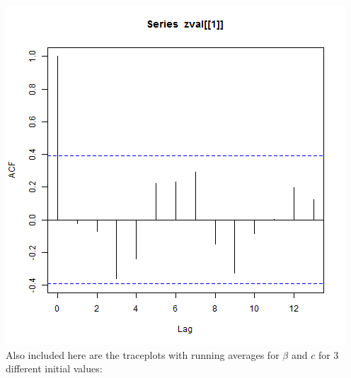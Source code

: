 \documentclass{article}
\begin{document}
\begin{enumerate}
\begin{enumerate}
\includegraphics[scale=0.4]{acfz.png}\\

Also included here are the traceplots with running averages for $\beta$ and $c$ for 3 different initial values:


\end{enumerate}
\end{enumerate}
\end{document}
